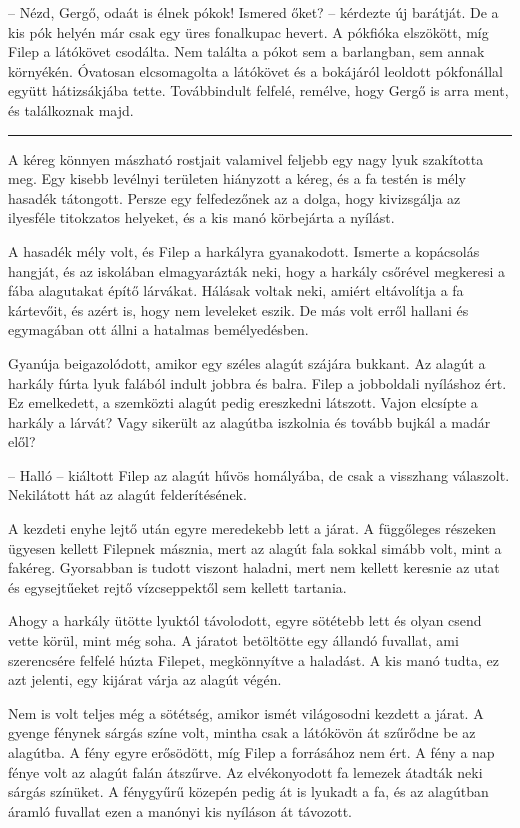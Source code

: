 \documentclass[10pt]{memoir}
\renewcommand{\pfbreakdisplay}{\bigskip \ding{166} \bigskip}
\newcommand{\secbreak}{\fancybreak{\pfbreakdisplay}\indent}
\begin{document}
-- Nézd, Gergő, odaát is élnek pókok! Ismered őket? -- kérdezte új barátját.
De a kis pók helyén már csak egy üres fonalkupac hevert. A pókfióka elszökött,
míg Filep a látókövet csodálta. Nem találta a pókot sem a barlangban, sem annak
környékén. Óvatosan elcsomagolta a látókövet és a bokájáról leoldott
pókfonállal együtt hátizsákjába tette. Továbbindult felfelé, remélve, hogy
Gergő is arra ment, és találkoznak majd.

\secbreak

A kéreg könnyen mászható rostjait valamivel feljebb egy nagy lyuk szakította
meg. Egy kisebb levélnyi területen hiányzott a kéreg, és a fa testén is mély
hasadék tátongott. Persze egy felfedezőnek az a dolga, hogy kivizsgálja az
ilyesféle titokzatos helyeket, és a kis manó körbejárta a nyílást.

A hasadék mély volt, és Filep a harkályra gyanakodott. Ismerte a kopácsolás
hangját, és az iskolában elmagyarázták neki, hogy a harkály csőrével megkeresi
a fába alagutakat építő lárvákat. Hálásak voltak neki, amiért eltávolítja a fa
kártevőit, és azért is, hogy nem leveleket eszik. De más volt erről hallani és
egymagában ott állni a hatalmas bemélyedésben.

Gyanúja beigazolódott, amikor egy széles alagút szájára bukkant. Az alagút a
harkály fúrta lyuk falából indult jobbra és balra. Filep a jobboldali nyíláshoz
ért. Ez emelkedett, a szemközti alagút pedig ereszkedni látszott. Vajon
elcsípte a harkály a lárvát? Vagy sikerült az alagútba iszkolnia és tovább
bujkál a madár elől?

-- Halló -- kiáltott Filep az alagút hűvös homályába, de csak a visszhang
válaszolt. Nekilátott hát az alagút felderítésének.

A kezdeti enyhe lejtő után egyre meredekebb lett a járat. A függőleges részeken
ügyesen kellett Filepnek másznia, mert az alagút fala sokkal simább volt, mint
a fakéreg. Gyorsabban is tudott viszont haladni, mert nem kellett keresnie az
utat és egysejtűeket rejtő vízcseppektől sem kellett tartania.

Ahogy a harkály ütötte lyuktól távolodott, egyre sötétebb lett és olyan csend
vette körül, mint még soha. A járatot betöltötte egy állandó fuvallat, ami
szerencsére felfelé húzta Filepet, megkönnyítve a haladást. A kis manó tudta,
ez azt jelenti, egy kijárat várja az alagút végén.

Nem is volt teljes még a sötétség, amikor ismét világosodni kezdett a járat. A
gyenge fénynek sárgás színe volt, mintha csak a látókövön át szűrődne be az
alagútba. A fény egyre erősödött, míg Filep a forrásához nem ért. A fény a nap
fénye volt az alagút falán átszűrve. Az elvékonyodott fa lemezek átadták neki
sárgás színüket. A fénygyűrű közepén pedig át is lyukadt a fa, és az alagútban
áramló fuvallat ezen a manónyi kis nyíláson át távozott.
\end{document}
